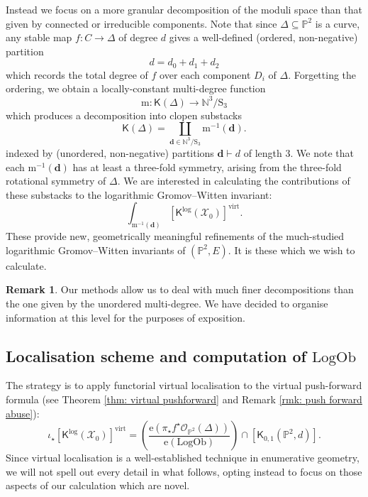\documentclass[11pt]{amsart}
\theoremstyle{definition}
\theoremstyle{definition}
\newtheorem{remark}[theorem]{Remark}
\newcommand{\op}[1]{\operatorname{#1}}
\newcommand{\e}{\mathrm{e}}
\newcommand{\PP}{\mathbb{P}}
\newcommand{\OO}{\mathcal{O}}
\newcommand{\N}{\mathbb{N}}
\newcommand{\virt}{\op{virt}}
\newcommand{\LogOb}{\mathrm{LogOb}}
\newcommand{\Xcal}{\mathcal{X}}
\newcommand{\Kup}{\mathsf{K}}
\begin{document}
Instead we focus on a more granular decomposition of the moduli space than that given by connected or irreducible components. Note that since $\Delta \subseteq \PP^2$ is a curve, any stable map $f \colon C \to \Delta$ of degree $d$ gives a well-defined (ordered, non-negative) partition
\begin{equation*} d = d_0+d_1+d_2 \end{equation*}
which records the total degree of $f$ over each component $D_i$ of $\Delta$. Forgetting the ordering, we obtain a locally-constant multi-degree function
\begin{equation*} \mathrm{m} \colon \Kup(\Delta) \to \N^3/\mathrm{S}_3 \end{equation*}
which produces a decomposition into clopen substacks
\begin{equation*} \Kup(\Delta) = \coprod_{\mathbf{d} \in \N^3/\mathrm{S}_3} \mathrm{m}^{-1}(\mathbf{d}).\end{equation*}
indexed by (unordered, non-negative) partitions $\mathbf{d} \vdash d$ of length $3$. We note that each $\mathrm{m}^{-1}(\mathbf{d})$ has at least a three-fold symmetry, arising from the three-fold rotational symmetry of $\Delta$. We are interested in calculating the contributions of these substacks to the logarithmic Gromov--Witten invariant:
\begin{equation*} \int_{\mathrm{m}^{-1}(\mathbf{d})} [\Kup^{\log}(\Xcal_0)]^{\virt}. \end{equation*}
These provide new, geometrically meaningful refinements of the much-studied logarithmic Gromov--Witten invariants of $(\PP^2,E)$. It is these which we wish to calculate.


\begin{remark} Our methods allow us to deal with much finer decompositions than the one given by the unordered multi-degree. We have decided to organise information at this level for the purposes of exposition. \end{remark}

\subsection{Localisation scheme and computation of $\LogOb$}\label{sec: localisation scheme} The strategy is to apply functorial virtual localisation to the virtual push-forward formula (see Theorem \ref{thm: virtual pushforward} and Remark \ref{rmk: push forward abuse}):
\begin{equation*} \iota_\star [\Kup^{\log}(\Xcal_0)]^{\virt} = \left( \dfrac{\e(\pi_\star f^\star \OO_{\PP^2}(\Delta))}{\e(\LogOb)} \right) \cap [\Kup_{0,1}(\PP^2,d)].\end{equation*}
Since virtual localisation is a well-established technique in enumerative geometry, we will not spell out every detail in what follows, opting instead to focus on those aspects of our calculation which are novel. 
\end{document}
